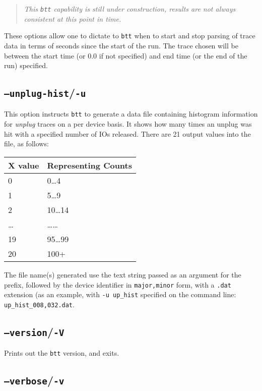 \documentclass{article}
\begin{document}
  \begin{quote}
    \emph{This \texttt{btt} capability is still under construction, results are
    not always consistent at this point in time.}
  \end{quote}

  These options allow one to dictate to \texttt{btt} when to start and stop
  parsing of trace data in terms of seconds since the start of the run. The
  trace chosen will be between the start time (or 0.0 if not
  specified) and end time (or the end of the run) specified.

\subsection{\label{sec:o-u}\texttt{--unplug-hist}/\texttt{-u}}

  This option instructs \texttt{btt} to generate a data file containing
  histogram information for \emph{unplug} traces on a per device
  basis. It shows how many times an unplug was hit with a specified
  number of IOs released. There are 21 output values into the file, as
  follows:

  \medskip
  \begin{tabular}{ll}
\textbf{X value} & \textbf{Representing Counts} \\\hline
0 & 0\dots\/4 \\
1 & 5\dots\/9 \\
2 & 10\dots\/14 \\
\dots & \dots\dots\\
19 & 95\dots\/99 \\
20 & 100+ \\
  \end{tabular}

  \medskip
  The file name(s) generated use the text string passed as an argument for
  the prefix, followed by the device identifier in \texttt{major,minor}
  form, with a \texttt{.dat} extension (as an example, with \texttt{-u
  up\_hist} specified on the command line: \texttt{up\_hist\_008,032.dat}.

\subsection{\label{sec:o-V}\texttt{--version}/\texttt{-V}}

  Prints out the \texttt{btt} version, and exits.

\subsection{\label{sec:o-v}\texttt{--verbose}/\texttt{-v}}
\end{document}

